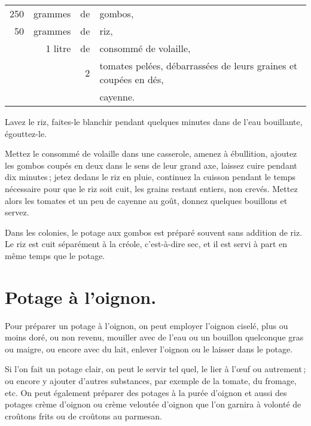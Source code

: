 \footnotesize
\begin{longtable}{rrrp{16em}}
   250 & grammes  & de & gombos,                                                                          \\
    50 & grammes  & de & riz,                                                                             \\
       & 1 litre  & de & consommé de volaille,                                                            \\
       &          &  2 & tomates pelées, débarrassées de leurs graines et coupées en dés,                 \\
       &          &    & cayenne.                                                                         \\
\end{longtable}
\normalsize                 

Lavez le riz, faites-le blanchir pendant quelques minutes dans de l'eau
bouillante, égouttez-le.

Mettez le consommé de volaille dans une casserole, amenez à ébullition, ajoutez
les gombos coupés en deux dans le sens de leur grand axe, laissez cuire pendant
dix minutes ; jetez dedans le riz en pluie, continuez la cuisson pendant le
temps nécessaire pour que le riz soit cuit, les grains restant entiers, non
crevés. Mettez alors les tomates et un peu de cayenne au goût, donnez quelques
bouillons et servez.

Dans les colonies, le potage aux gombos est préparé souvent sans addition de
riz. Le riz est cuit séparément à la créole, c'est-à-dire sec, et il est servi
à part en même temps que le potage.

\section*{\centering Potage à l'oignon.}

Pour préparer un potage à l'oignon, on peut employer l'oignon ciselé, plus ou
moins doré, ou non revenu, mouiller avec de l'eau ou un bouillon quelconque
gras ou maigre, ou encore avec du lait, enlever l'oignon ou le laisser dans le
potage.

Si l'on fait un potage clair, on peut le servir tel quel, le lier à l'œuf ou
autrement ; ou encore y ajouter d'autres substances, par exemple de la tomate,
du fromage, etc. On peut également préparer des potages à la purée d'oignon et
aussi des potages crème d'oignon ou crème veloutée d'oignon que l’on garnira
à volonté de croûtons frits ou de croûtons au parmesan.

